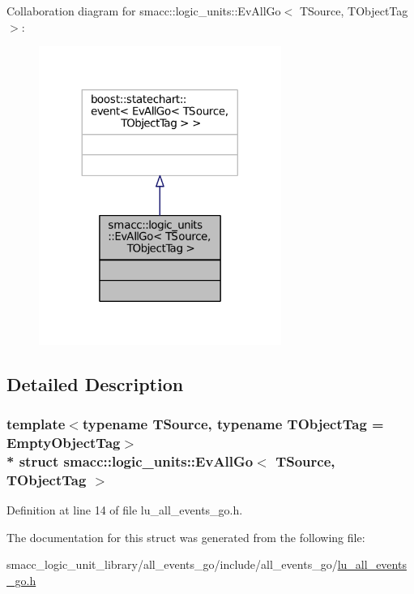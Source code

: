 Collaboration diagram for smacc\+:\+:logic\+\_\+units\+:\+:Ev\+All\+Go$<$ T\+Source, T\+Object\+Tag $>$\+:
\nopagebreak
\begin{figure}[H]
\begin{center}
\leavevmode
\includegraphics[width=224pt]{structsmacc_1_1logic__units_1_1EvAllGo__coll__graph}
\end{center}
\end{figure}


\subsection{Detailed Description}
\subsubsection*{template$<$typename T\+Source, typename T\+Object\+Tag = Empty\+Object\+Tag$>$\\*
struct smacc\+::logic\+\_\+units\+::\+Ev\+All\+Go$<$ T\+Source, T\+Object\+Tag $>$}



Definition at line 14 of file lu\+\_\+all\+\_\+events\+\_\+go.\+h.



The documentation for this struct was generated from the following file\+:\begin{DoxyCompactItemize}
\item 
smacc\+\_\+logic\+\_\+unit\+\_\+library/all\+\_\+events\+\_\+go/include/all\+\_\+events\+\_\+go/\hyperlink{lu__all__events__go_8h}{lu\+\_\+all\+\_\+events\+\_\+go.\+h}\end{DoxyCompactItemize}
